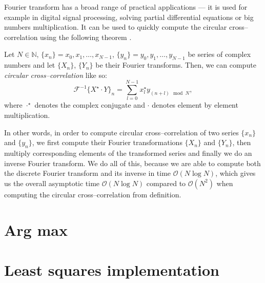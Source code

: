 Fourier transform has a broad range of practical applications --- it is used for example in digital signal processing, solving partial differential equations or big numbers multiplication. It can be used to quickly compute the circular cross--correlation using the following theorem \cite{proakis2004digital}.

Let $N \in \mathbb{N}$, $\{x_n\} = x_0, x_1, \dots , x_{N-1}$, $\{y_n\} = y_0, y_1, \dots , y_{N-1}$ be series of complex numbers and let $\{X_n\}$, $\{Y_n\}$ be their Fourier transforms. Then, we can compute \emph{circular cross--correlation} like so: 
\[
\mathcal{F}^{-1}\{X^\star \cdot Y\}_n = \sum_{l=0}^{N-1}x^\star_ly_{(n+l)\mod N},
\]
where $\cdot^\star$ denotes the complex conjugate and $\cdot$ denotes element by element multiplication.

In other words, in order to compute circular cross--correlation of two series $\{x_n\}$ and $\{y_n\}$, we first compute their Fourier transformations $\{X_n\}$ and $\{Y_n\}$, then multiply corresponding elements of the transformed series and finally we do an inverse Fourier transform. We do all of this, because we are able to compute both the discrete Fourier transform and its inverse in time $\mathcal{O}(N \log N)$, which gives us the overall asymptotic time $\mathcal{O}(N \log N)$ compared to $\mathcal{O}(N^2)$ when computing the circular cross--correlation from definition.



\section{Arg max}


\section{Least squares implementation}